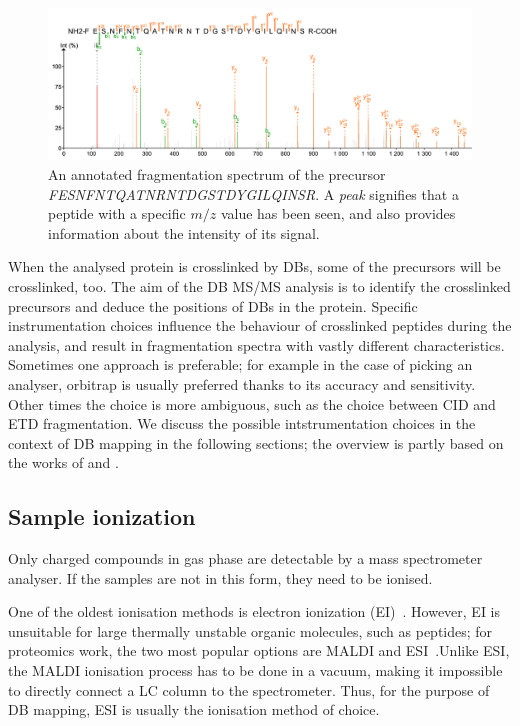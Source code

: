 \begin{figure}
  \centering
  \includegraphics[width=1\linewidth]{img/fragmentation-spectrum.png}
  \caption{An annotated fragmentation spectrum of the precursor \emph{FESNFNTQATNRNTDGSTDYGILQINSR}. A \emph{peak} signifies that a peptide with a specific \(m/z\) value has been seen, and also provides information about the intensity of its signal.}\label{fig:frag-spectrum}
\end{figure}

When the analysed protein is crosslinked by DBs, some of the precursors will be crosslinked, too. The aim of the DB MS/MS analysis is to identify the crosslinked precursors and deduce the positions of DBs in the protein. Specific instrumentation choices influence the behaviour of crosslinked peptides during the analysis, and result in fragmentation spectra with vastly different characteristics. Sometimes one approach is preferable; for example in the case of picking an analyser, orbitrap is usually preferred thanks to its accuracy and sensitivity. Other times the choice is more ambiguous, such as the choice between CID and ETD fragmentation. We discuss the possible intstrumentation choices in the context of DB mapping in the following sections; the overview is partly based on the works of \citet{matthiesen2007mass} and \citet{gross2006mass}.

\subsection{Sample ionization}\label{sec:ionisation}

Only charged compounds in gas phase are detectable by a mass spectrometer analyser. If the samples are not in this form, they need to be ionised.

One of the oldest ionisation methods is electron ionization (EI)~\cite{field2013electron}. However, EI is unsuitable for large thermally unstable organic molecules, such as peptides; for proteomics work, the two most popular options are MALDI and ESI~\cite{caprioli1997molecular, fenn1990electrospray}.\@ Unlike ESI, the MALDI ionisation process has to be done in a vacuum, making it impossible to directly connect a LC column to the spectrometer. Thus, for the purpose of DB mapping, ESI is usually the ionisation method of choice.

